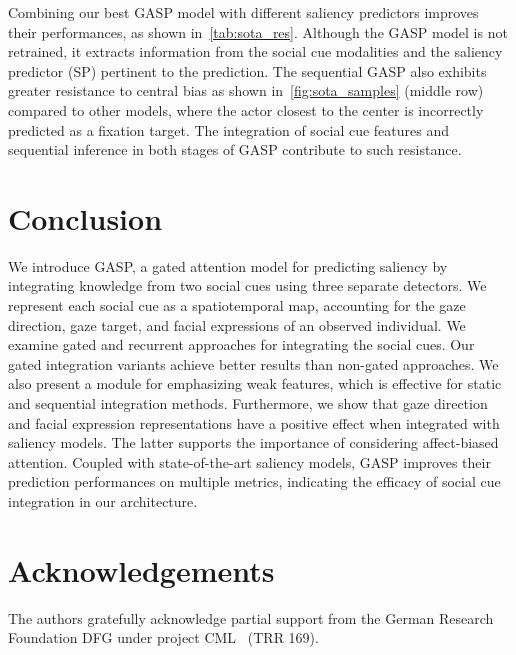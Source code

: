 \documentclass{article}
\begin{document}
Combining our best GASP model with different saliency predictors improves their performances, as shown in~\autoref{tab:sota_res}. Although the GASP model is not retrained, it extracts information from the social cue modalities and the saliency predictor (SP) pertinent to the prediction. The sequential GASP also exhibits greater resistance to central bias as shown in~\autoref{fig:sota_samples} (middle row) compared to other models, where the actor closest to the center is incorrectly predicted as a fixation target. The integration of social cue features and sequential inference in both stages of GASP contribute to such resistance.


\section{Conclusion}
\label{sec:conc}

We introduce GASP, a gated attention model for predicting saliency by integrating knowledge from two social cues using three separate detectors. We represent each social cue as a spatiotemporal map, accounting for the gaze direction, gaze target, and facial expressions of an observed individual. We examine gated and recurrent approaches for integrating the social cues. Our gated integration variants achieve better results than non-gated approaches. We also present a module for emphasizing weak features, which is effective for static and sequential integration methods. Furthermore, we show that gaze direction and facial expression representations have a positive effect when integrated with saliency models. The latter supports the importance of considering affect-biased attention. Coupled with state-of-the-art saliency models, GASP improves their prediction performances on multiple metrics, indicating the efficacy of social cue integration in our architecture. 













\section*{Acknowledgements}
The authors gratefully acknowledge partial support from the German
Research Foundation DFG under project CML ~(TRR 169).
















\end{document}
